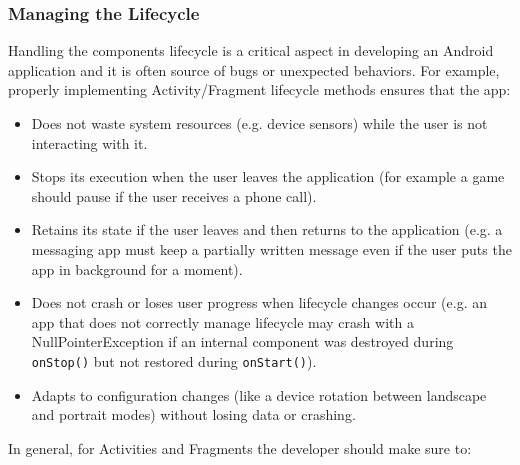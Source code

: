 \documentclass[11pt,a4paper,notitlepage]{article}
\begin{document}
\subsubsection{Managing the Lifecycle}\label{managing_lifecycle}
Handling the components lifecycle is a critical aspect in developing an Android application and it is often source of bugs or unexpected behaviors. For example, properly implementing Activity/Fragment lifecycle methods ensures that the app:
\begin{itemize}
	\item Does not waste system resources (e.g. device sensors) while the user is not interacting with it.
	\item Stops its execution when the user leaves the application (for example a game should pause if the user receives a phone call).
	\item Retains its state if the user leaves and then returns to the application (e.g. a messaging app must keep a partially written message even if the user puts the app in background for a moment).
	\item Does not crash or loses user progress when lifecycle changes occur (e.g. an app that does not correctly manage lifecycle may crash with a NullPointerException if an internal component was destroyed during \texttt{onStop()} but not restored during \texttt{onStart()}).
	\item Adapts to configuration changes (like a device rotation between landscape and portrait modes) without losing data or crashing.
\end{itemize}\medskip
In general, for Activities and Fragments the developer should make sure to:
\end{document}
